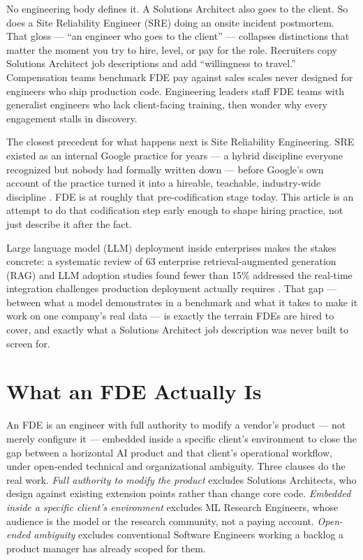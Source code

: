 \documentclass[journal]{IEEEtran}
\begin{document}
No engineering body defines it. A Solutions Architect also goes to the client. So does a Site Reliability Engineer (SRE) doing an onsite incident postmortem. That gloss --- ``an engineer who goes to the client'' --- collapses distinctions that matter the moment you try to hire, level, or pay for the role. Recruiters copy Solutions Architect job descriptions and add ``willingness to travel.'' Compensation teams benchmark FDE pay against sales scales never designed for engineers who ship production code. Engineering leaders staff FDE teams with generalist engineers who lack client-facing training, then wonder why every engagement stalls in discovery.

The closest precedent for what happens next is Site Reliability Engineering. SRE existed as an internal Google practice for years --- a hybrid discipline everyone recognized but nobody had formally written down --- before Google's own account of the practice turned it into a hireable, teachable, industry-wide discipline \cite{beyer2016sre}. FDE is at roughly that pre-codification stage today. This article is an attempt to do that codification step early enough to shape hiring practice, not just describe it after the fact.

Large language model (LLM) deployment inside enterprises makes the stakes concrete: a systematic review of 63 enterprise retrieval-augmented generation (RAG) and LLM adoption studies found fewer than 15\% addressed the real-time integration challenges production deployment actually requires \cite{karakurt2026rag}. That gap --- between what a model demonstrates in a benchmark and what it takes to make it work on one company's real data --- is exactly the terrain FDEs are hired to cover, and exactly what a Solutions Architect job description was never built to screen for.

\section{What an FDE Actually Is}
\label{sec:whatisfde}

An FDE is an engineer with full authority to modify a vendor's product --- not merely configure it --- embedded inside a specific client's environment to close the gap between a horizontal AI product and that client's operational workflow, under open-ended technical and organizational ambiguity. Three clauses do the real work. \emph{Full authority to modify the product} excludes Solutions Architects, who design against existing extension points rather than change core code. \emph{Embedded inside a specific client's environment} excludes ML Research Engineers, whose audience is the model or the research community, not a paying account. \emph{Open-ended ambiguity} excludes conventional Software Engineers working a backlog a product manager has already scoped for them.
\end{document}
